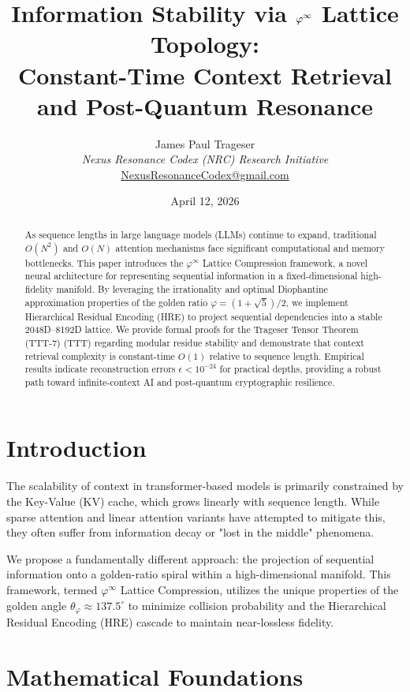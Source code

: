\documentclass[11pt,a4paper,oneside]{article}
\title{\textbf{Information Stability via $\phiinf$ Lattice Topology:\\Constant-Time Context Retrieval and Post-Quantum Resonance}}
\author{
    James Paul Trageser \\
    \textit{Nexus Resonance Codex (NRC) Research Initiative} \\
    \href{mailto:NexusResonanceCodex@gmail.com}{NexusResonanceCodex@gmail.com}
}
\date{April 12, 2026}
\theoremstyle{definition}
\theoremstyle{remark}
\newcommand{\phiinf}{\varphi^\infty}
\begin{document}
\maketitle

\begin{abstract}
As sequence lengths in large language models (LLMs) continue to expand, traditional $O(N^2)$ and $O(N)$ attention mechanisms face significant computational and memory bottlenecks. This paper introduces the $\phiinf$ Lattice Compression framework, a novel neural architecture for representing sequential information in a fixed-dimensional high-fidelity manifold. By leveraging the irrationality and optimal Diophantine approximation properties of the golden ratio $\varphi = (1+\sqrt{5})/2$, we implement Hierarchical Residual Encoding (HRE) to project sequential dependencies into a stable 2048D--8192D lattice. We provide formal proofs for the Trageser Tensor Theorem (TTT-7) (TTT) regarding modular residue stability and demonstrate that context retrieval complexity is constant-time $O(1)$ relative to sequence length. Empirical results indicate reconstruction errors $\epsilon < 10^{-24}$ for practical depths, providing a robust path toward infinite-context AI and post-quantum cryptographic resilience.
\end{abstract}

\section{Introduction}

The scalability of context in transformer-based models is primarily constrained by the Key-Value (KV) cache, which grows linearly with sequence length. While sparse attention and linear attention variants have attempted to mitigate this, they often suffer from information decay or "lost in the middle" phenomena. 

We propose a fundamentally different approach: the projection of sequential information onto a golden-ratio spiral within a high-dimensional manifold. This framework, termed $\phiinf$ Lattice Compression, utilizes the unique properties of the golden angle $\theta_\varphi \approx 137.5^\circ$ to minimize collision probability and the Hierarchical Residual Encoding (HRE) cascade to maintain near-lossless fidelity.

\section{Mathematical Foundations}
\end{document}

